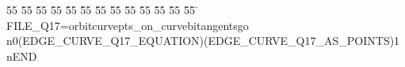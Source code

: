 %
%
\begin{tabbing}
55 \= 55 \= 55 \= 55 \= 55 \= 55 \= 55 \= 55 \= 55 \= 55 \= 55 \= 55 \= 55 \= \kill
FILE\_Q17=orbitcurvepts\_on\_curvebitangentsgo\\[0pt]
n0(EDGE\_CURVE\_Q17\_EQUATION)(EDGE\_CURVE\_Q17\_AS\_POINTS)1\\[0pt]
nEND\\[0pt]
\end{tabbing}
